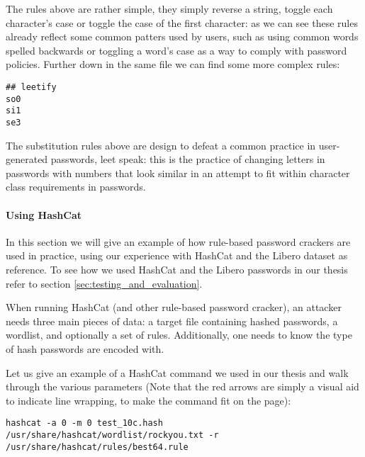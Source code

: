The rules above are rather simple, they simply reverse a string, toggle each character's case or toggle the case of the first character: as we can see these rules already reflect some common patters used by users, such as using common words spelled backwards or toggling a word's case as a way to comply with password policies.
Further down in the same file we can find some more complex rules:
\begin{verbatim}
## leetify
so0
si1
se3
\end{verbatim}

The substitution rules above are design to defeat a common practice in user-generated passwords, leet speak: this is the practice of changing letters in passwords with numbers that look similar in an attempt to fit within character class requirements in passwords. 

\paragraph{Using HashCat}
In this section we will give an example of how rule-based password crackers are used in practice, using our experience with HashCat and the Libero dataset as reference. To see how we used HashCat and the Libero passwords in our thesis refer to section \ref{sec:testing_and_evaluation}.

When running HashCat (and other rule-based password cracker), an attacker needs three main pieces of data: a target file containing hashed passwords, a wordlist, and optionally a set of rules.
Additionally, one needs to know the type of hash passwords are encoded with.

Let us give an example of a HashCat command we used in our thesis and walk through the various parameters (Note that the red arrows are simply a visual aid to indicate line wrapping, to make the command fit on the page):

\begin{lstlisting}[breaklines=true,postbreak=\mbox{\textcolor{red}{$\hookrightarrow$}\space}]
hashcat -a 0 -m 0 test_10c.hash /usr/share/hashcat/wordlist/rockyou.txt -r /usr/share/hashcat/rules/best64.rule
\end{lstlisting}

